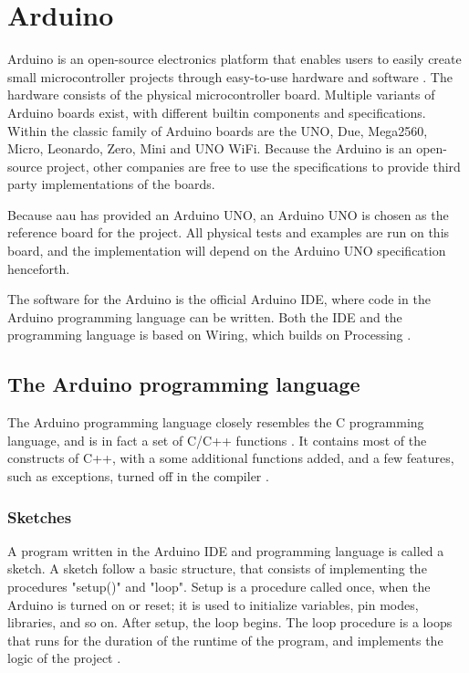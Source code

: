 \section{Arduino}\label{sec:arduino}
Arduino is an open-source electronics platform that enables users to easily create small microcontroller projects through easy-to-use hardware and software \cite{WhatArduino}. The hardware consists of the physical microcontroller board. Multiple variants of Arduino boards exist, with different builtin components and specifications. Within the classic family of Arduino boards are the UNO, Due, Mega2560, Micro, Leonardo, Zero, Mini and UNO WiFi. Because the Arduino is an open-source project, other companies are free to use the specifications to provide third party implementations of the boards.

Because \gls{aau} has provided an Arduino UNO, an Arduino UNO is chosen as the reference board for the project. All physical tests and examples are run on this board, and the implementation will depend on the Arduino UNO specification henceforth.

The software for the Arduino is the official Arduino IDE, where code in the Arduino programming language can be written. Both the IDE and the programming language is based on Wiring, which builds on Processing \cite{WhatArduino,WiringOrg}.

\subsection{The Arduino programming language}\label{subsec:arduinoprogramminglanguage}
The Arduino programming language closely resembles the C programming language, and is in fact a set of C/C++ functions \cite{ArduinoSupportC}. It contains most of the constructs of C++, with a some additional functions added, and a few features, such as exceptions, turned off in the compiler \cite{Nongnuorg}.

\subsubsection{Sketches}
A program written in the Arduino IDE and programming language is called a sketch. A sketch follow a basic structure, that consists of implementing the procedures "setup()" and "loop". Setup is a procedure called once, when the Arduino is turned on or reset; it is used to initialize variables, pin modes, libraries, and so on. After setup, the loop begins. The loop procedure is a loops that runs for the duration of the runtime of the program, and implements the logic of the project \cite{ArduinoLanguage}.


